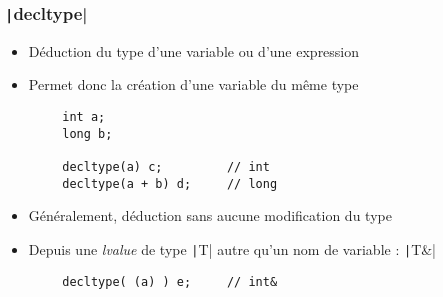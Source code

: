 \documentclass[C++.tex]{subfiles}
\begin{document}
\begin{frame}[fragile]
	\frametitle{\texttt|decltype|}
	\begin{itemize}
		\item Déduction du type d'une variable ou d'une expression
		\item Permet donc la création d'une variable du même type
	\end{itemize}

	\begin{verbatim}
		int a;
		long b;

		decltype(a) c;         // int
		decltype(a + b) d;     // long
	\end{verbatim}

	\begin{itemize}
		\item Généralement, déduction sans aucune modification du type


		\item Depuis une \textit{lvalue} de type \texttt|T| autre qu'un nom de variable : \texttt|T&|
	\end{itemize}

	\begin{verbatim}
		decltype( (a) ) e;     // int&
	\end{verbatim}



\end{frame}
\end{document}
